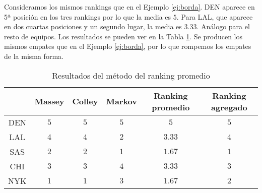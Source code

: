 \begin{ejemplo}
Consideramos los mismos rankings que en el Ejemplo \ref{ej:borda}. DEN aparece en 5ª posición en los tres rankings por lo que la media es $5$. Para LAL, que aparece en dos cuartas posiciones y un segundo lugar, la media es $3.33$. Análogo para el resto de equipos. Los resultados se pueden ver en la Tabla \ref{tbl:promedio_resultados}. Se producen los mismos empates que en el Ejemplo \ref{ej:borda}, por lo que rompemos los empates de la misma forma.

\begin{table}[h]
\centering
\caption{Resultados del método del ranking promedio}
\label{tbl:promedio_resultados}
\begin{tabular}{@{}cccccc@{}}
\cmidrule(l){2-6}
    & Massey & Colley & Markov & Ranking promedio & Ranking agregado \\ \midrule
DEN & $5$    & $5$    & $5$    & $5$              & $5$              \\
LAL & $4$    & $4$    & $2$    & $3.33$           & $4$              \\
SAS & $2$    & $2$    & $1$    & $1.67$           & $1$              \\
CHI & $3$    & $3$    & $4$    & $3.33$           & $3$              \\
NYK & $1$    & $1$    & $3$    & $1.67$           & $2$              \\ \bottomrule
\end{tabular}
\end{table}



\end{ejemplo}